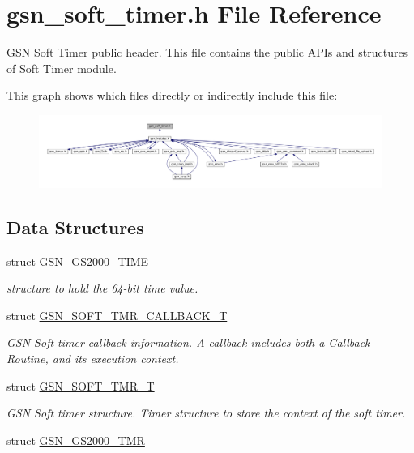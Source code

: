 \hypertarget{a00586}{
\section{gsn\_\-soft\_\-timer.h File Reference}
\label{a00586}
}


GSN Soft Timer public header. This file contains the public APIs and structures of Soft Timer module.  


This graph shows which files directly or indirectly include this file:
\nopagebreak
\begin{figure}[H]
\begin{center}
\leavevmode
\includegraphics[width=400pt]{a00825}
\end{center}
\end{figure}
\subsection*{Data Structures}
\begin{DoxyCompactItemize}
\item 
struct \hyperlink{a00083}{GSN\_\-GS2000\_\-TIME}
\begin{DoxyCompactList}\small\item\em structure to hold the 64-\/bit time value. \end{DoxyCompactList}\item 
struct \hyperlink{a00228}{GSN\_\-SOFT\_\-TMR\_\-CALLBACK\_\-T}
\begin{DoxyCompactList}\small\item\em GSN Soft timer callback information. A callback includes both a Callback Routine, and its execution context. \end{DoxyCompactList}\item 
struct \hyperlink{a00229}{GSN\_\-SOFT\_\-TMR\_\-T}
\begin{DoxyCompactList}\small\item\em GSN Soft timer structure. Timer structure to store the context of the soft timer. \end{DoxyCompactList}\item 
struct \hyperlink{a00084}{GSN\_\-GS2000\_\-TMR}
\end{DoxyCompactItemize}

